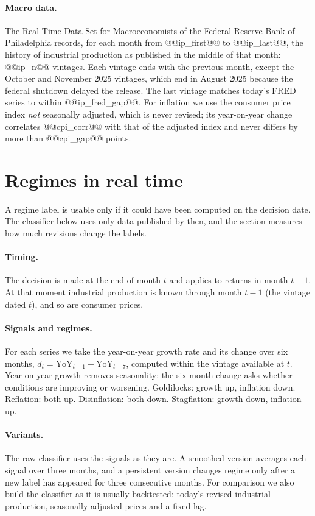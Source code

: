 \documentclass[11pt,a4paper]{article}
\begin{document}
\paragraph{Macro data.} The Real-Time Data Set for Macroeconomists of the Federal Reserve Bank of
Philadelphia \citep{croushore2001} records, for each month from @@ip_first@@ to @@ip_last@@, the history of
industrial production as published in the middle of that month: @@ip_n@@ vintages. Each vintage ends with the
previous month, except the October and November 2025 vintages, which end in August 2025 because the federal
shutdown delayed the release. The last vintage matches today's FRED series to within @@ip_fred_gap@@. For
inflation we use the consumer price index \emph{not} seasonally adjusted, which is never revised; its
year-on-year change correlates @@cpi_corr@@ with that of the adjusted index and never differs by more than
@@cpi_gap@@ points.

\section{Regimes in real time}
\label{sec:regimes}

A regime label is usable only if it could have been computed on the decision date. The classifier below uses only data published by then, and the section measures how much revisions change the labels.


\paragraph{Timing.} The decision is made at the end of month $t$ and applies to returns in month $t+1$. At that
moment industrial production is known through month $t-1$ (the vintage dated $t$), and so are consumer
prices.

\paragraph{Signals and regimes.} For each series we take the year-on-year growth rate and its change over six
months, $d_t = \text{YoY}_{t-1} - \text{YoY}_{t-7}$, computed within the vintage available at $t$. Year-on-year
growth removes seasonality; the six-month change asks whether conditions are improving or worsening.
Goldilocks: growth up, inflation down. Reflation: both up. Disinflation: both down. Stagflation: growth down,
inflation up.

\paragraph{Variants.} The raw classifier uses the signals as they are. A smoothed version averages each signal
over three months, and a persistent version changes regime only after a new label has appeared for three
consecutive months. For comparison we also build the classifier as it is usually backtested: today's revised
industrial production, seasonally adjusted prices and a fixed lag.
\end{document}
